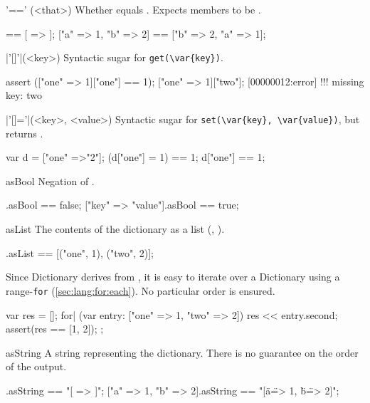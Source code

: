 \begin{urbiscriptapi}
\item['=='](<that>)%
  Whether \this equals .  Expects members to be
  .
\begin{urbiassert}
[ => ] == [ => ];
["a" => 1, "b" => 2] == ["b" => 2, "a" => 1];
\end{urbiassert}


\item|'[]'|(<key>)%
  Syntactic sugar for \lstinline|get(\var{key})|.

\begin{urbiscript}
assert (["one" => 1]["one"] == 1);
["one" => 1]["two"];
[00000012:error] !!! missing key: two
\end{urbiscript}


\item|'[]='|(<key>, <value>)%
  Syntactic sugar for \lstinline|set(\var{key}, \var{value})|, but returns
  .

\begin{urbiassert}
var d = ["one" =>"2"];
(d["one"] = 1) == 1;
d["one"] == 1;
\end{urbiassert}


\item[asBool]
  Negation of .
\begin{urbiassert}
[=>].asBool == false;
["key" => "value"].asBool == true;
\end{urbiassert}


\item[asList]%
  The contents of the dictionary as a  list (,
  ).

\begin{urbiassert}
["one" => 1, "two" => 2].asList == [("one", 1), ("two", 2)];
\end{urbiassert}

  \noindent
  Since Dictionary derives from , it is easy
  to iterate over a Dictionary using a range-\lstinline|for|
  (\autoref{sec:lang:for:each}).  No particular order is ensured.
\begin{urbiscript}
{
  var res = [];
  for| (var entry: ["one" => 1, "two" => 2])
    res << entry.second;
  assert(res == [1, 2]);
};
\end{urbiscript}


\item[asString] A string representing the dictionary.  There is no guarantee
  on the order of the output.
\begin{urbiassert}
                [=>].asString == "[ => ]";
["a" => 1, "b" => 2].asString == "[\"a\" => 1, \"b\" => 2]";
\end{urbiassert}


\end{urbiscriptapi}
